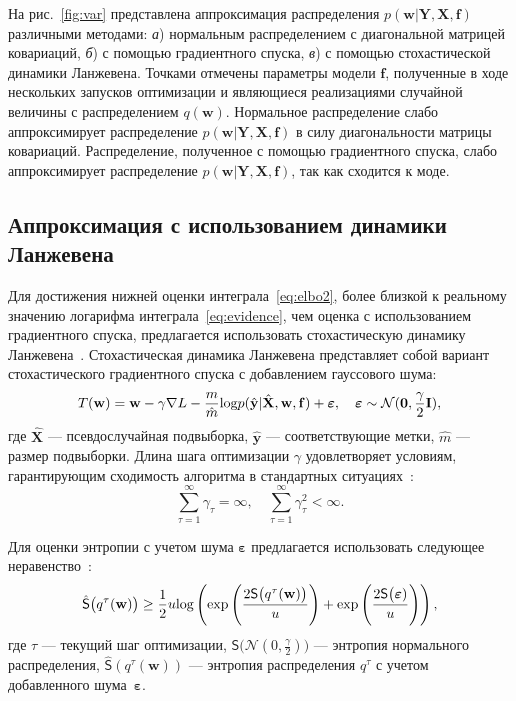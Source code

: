 На рис.~\ref{fig:var} представлена  {аппроксимация распределения $p(\mathbf{w}|\mathbf{Y}, \mathbf{X}, \mathbf{f})$ различными методами: \textit{а}) нормальным распределением с диагональной матрицей ковариаций, \textit{б}) с помощью градиентного спуска, \textit{в}) с помощью стохастической динамики Ланжевена. Точками отмечены параметры модели $\mathbf{f}$, полученные в ходе нескольких запусков оптимизации и являющиеся реализациями случайной величины с распределением $q(\mathbf{w})$. Нормальное распределение слабо аппроксимирует распределение $p(\mathbf{w}|\mathbf{Y}, \mathbf{X}, \mathbf{f})$ в силу диагональности матрицы ковариаций. Распределение, полученное с помощью градиентного спуска, слабо аппроксимирует распределение $p(\mathbf{w}|\mathbf{Y}, \mathbf{X}, \mathbf{f})$, так как сходится к моде.}





\subsection{Аппроксимация с использованием динамики Ланжевена}
Для достижения нижней оценки интеграла~\eqref{eq:elbo2}, более близкой к реальному значению логарифма интеграла~\eqref{eq:evidence}, чем оценка с использованием градиентного спуска, предлагается использовать стохастическую динамику Ланжевена~\cite{langevin}. Стохастическая динамика Ланжевена представляет собой вариант стохастического градиентного спуска с добавлением гауссового шума:
\begin{equation}
\label{eq:langevin}
	T(\mathbf{w}) = \mathbf{w} -  \gamma \nabla L -\frac{m}{\hat{m}}\textnormal{log}p(\hat{\mathbf{y}}|\hat{\mathbf{X}}, \mathbf{w},\mathbf{f}) + \boldsymbol{\varepsilon}, \quad  \boldsymbol{\varepsilon} \sim \mathcal{N}(\mathbf{0}, {\frac{\gamma}{2}}\mathbf{I}),
\end{equation}
где $\hat{\mathbf{X}}$ --- псевдослучайная подвыборка, $\hat{\mathbf{y}}$ --- соответствующие метки, $\hat{m}$ --- размер подвыборки. Длина шага оптимизации $\gamma$ удовлетворяет  {условиям, гарантирующим сходимость алгоритма в стандартных ситуациях~\cite{langevin}}:
\[
	\sum_{\tau=1}^\infty \gamma_\tau = \infty, \quad \sum_{\tau=1}^\infty \gamma_\tau^2 < \infty.
\]

Для оценки энтропии с учетом шума $\boldsymbol{\varepsilon}$ предлагается использовать следующее неравенство~\cite{entropy,var_grad}:
\[
\hat{\mathsf{S}}\bigl(q^\tau(\mathbf{w})\bigr)   \geq \frac{1}{2}u\textnormal{log}\left(\textnormal{exp}\left(\frac{2\mathsf{S}\bigl(q^\tau(\mathbf{w})\bigr)}{u}\right) + \textnormal{exp}\left(\frac{2\mathsf{S}\bigl( \boldsymbol{\varepsilon})}{u}\right)\right),
\]
{где  $\tau$ --- текущий шаг оптимизации,} $\mathsf{S}\bigl( \mathcal{N}({0}, {\frac{\gamma}{2}})\bigr)$ --- энтропия нормального распределения, $\hat{\mathsf{S}}(q^\tau(\mathbf{w}))$ --- энтропия распределения $q^\tau$ с учетом добавленного шума~$\boldsymbol{\varepsilon}$.


